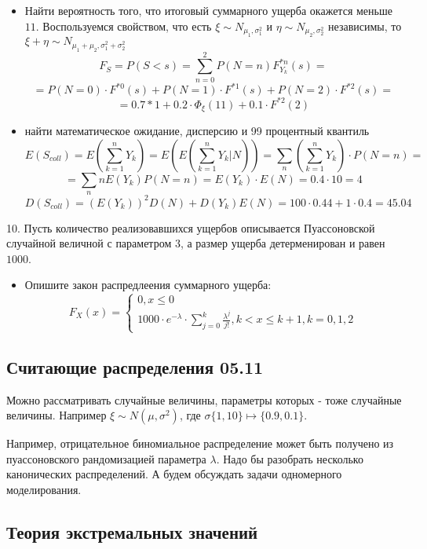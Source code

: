 \documentclass[%
12pt, %
final, %
oneside, %
onecolumn, %
centertags]{article} %
\theoremstyle{plain}
\theoremstyle{definition}
\theoremstyle{remark}
\begin{document}
\begin{itemize}
	\item Найти вероятность того, что итоговый суммарного ущерба окажется меньше $11$. Воспользуемся свойством, что есть $\xi \sim N_{\mu_1, \sigma_1^2}$ и $\eta \sim N_{\mu_2, \sigma_2^2}$ независимы, то $\xi + \eta \sim N_{\mu_1 + \mu_2, \sigma_1^2 + \sigma_2^2}$
	$$F_{S} = P(S < s) = \sum\limits_{n=0}^2 P(N = n)F_{Y_k}^{*n}(s) = $$
	$$ = P(N=0) \cdot F^{*0}(s) +  P(N=1) \cdot F^{*1}(s) +  P(N=2) \cdot F^{*2}(s) = $$
	$$ = 0.7 * 1 + 0.2 \cdot \Phi_{\xi}(11) + 0.1 \cdot  F^{*2}(2)$$
	\item найти математическое ожидание, дисперсию и 99 процентный квантиль
	$$E(S_{coll}) = E(\sum\limits_{k=1}^n Y_k) = E(E(\sum\limits_{k=1}^n Y_k \vert N)) = \sum\limits_n \left(\sum\limits_{k=1}^n Y_k\right) \cdot P(N = n) = $$
$$=\sum\limits_n n E(Y_k)P(N=n) = E(Y_k) \cdot E(N) = 0.4 \cdot 10 = 4$$
$$D(S_{coll}) = (E(Y_k))^2D(N) + D(Y_k)E(N) = 100 \cdot 0.44 + 1 \cdot 0.4 = 45.04$$
\end{itemize}

10. Пусть количество реализовавшихся ущербов описывается Пуассоновской случайной величной с параметром $3$, а размер ущерба детерменирован и равен $1000$. 
\begin{itemize}
	\item Опишите закон распредлеения суммарного ущерба:
	$$F_{X}(x) =\begin{cases}
		0, x \leqslant 0 \\
		1000 \cdot e^{-\lambda} \cdot \sum\limits_{j=0}^k \frac{\lambda^j}{j!}, k < x \leqslant k+1, k = 0, 1, 2
	\end{cases}$$

\end{itemize}


\subsection{Считающие распределения 05.11}

Можно рассматривать случайные величины, параметры которых - тоже случайные величины. Например $\xi \sim N(\mu, \sigma^2)$, где \(\sigma \{1,10\} \mapsto \{0.9, 0.1\}\).

Например, отрицательное биномиальное распределение может быть получено из пуассоновского рандомизацией параметра $\lambda$. Надо бы разобрать несколько канонических распределений. А будем обсуждать задачи одномерного моделирования.

\subsection{Теория экстремальных значений}
\end{document}
